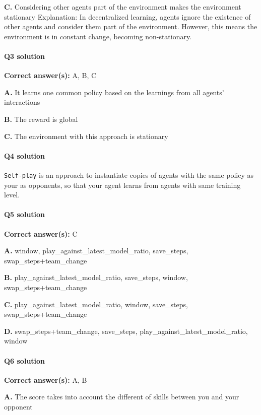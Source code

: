 \documentclass[11pt,a4paper]{article}
\begin{document}
\textbf{C.} Considering other agents part of the environment makes the environment stationary Explanation: In decentralized learning, agents ignore the existence of other agents and consider them part of the environment. However, this means the environment is in constant change, becoming non-stationary.

\paragraph{Q3 solution}

\textbf{Correct answer(s):} A, B, C

\textbf{A.} It learns one common policy based on the learnings from all agents' interactions

\textbf{B.} The reward is global

\textbf{C.} The environment with this approach is stationary

\paragraph{Q4 solution}

\texttt{Self-play} is an approach to instantiate copies of agents with the same policy as your as opponents, so that your agent learns from agents with same training level.

\paragraph{Q5 solution}

\textbf{Correct answer(s):} C

\textbf{A.} window, play\_against\_latest\_model\_ratio, save\_steps, swap\_steps+team\_change

\textbf{B.} play\_against\_latest\_model\_ratio, save\_steps, window, swap\_steps+team\_change

\textbf{C.} play\_against\_latest\_model\_ratio, window, save\_steps, swap\_steps+team\_change

\textbf{D.} swap\_steps+team\_change, save\_steps, play\_against\_latest\_model\_ratio, window

\paragraph{Q6 solution}

\textbf{Correct answer(s):} A, B

\textbf{A.} The score takes into account the different of skills between you and your opponent
\end{document}
